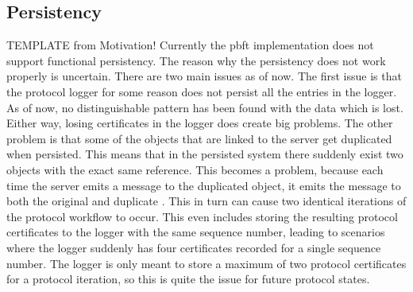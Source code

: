 \subsection{Persistency}
TEMPLATE from Motivation!
Currently the \ac{pbft} implementation does not support functional persistency. The reason why the persistency  does not work properly is uncertain. There are two main issues as of now. The first issue is that the protocol logger for some reason does not persist all the entries in the logger. As of now, no distinguishable pattern has been found with the data which is lost. Either way, losing certificates in the logger does create big problems. The other problem is that some of the  objects that are linked to the server get duplicated when persisted. This means that in the persisted system there suddenly exist two  objects with the exact same reference. This becomes a problem, because each time the server emits a message to the duplicated  object, it emits the message to both the original and duplicate . This in turn can cause two identical iterations of the protocol workflow to occur. This even includes storing the resulting protocol certificates to the logger with the same sequence number, leading to scenarios where the logger suddenly has four certificates recorded for a single sequence number. The logger is only meant to store a maximum of two protocol certificates for a protocol iteration, so this is quite the issue for future protocol states.